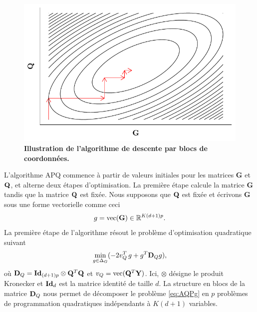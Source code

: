 \documentclass[12pt,a4paper,twoside]{ugathesis}
\begin{document}
\begin{figure}[t]
\centering
\includegraphics{./OUTPUT/Rplots/coordinate_descente.pdf}
\caption{{\bf Illustration de l'algorithme de descente par blocs de
    coordonnées.}}
\label{fig:coordinate_descente}
\end{figure}

L'algorithme APQ commence à partir de valeurs initiales pour les matrices
\(\mathbf{G}\) et \(\mathbf{Q}\), et alterne deux étapes d'optimisation. La première étape
calcule la matrice \(\mathbf{G}\) tandis que la matrice \(\mathbf{Q}\) est fixée. Nous
supposons que \(\mathbf{Q}\) est fixée et écrivons \(\mathbf{G}\) sous une forme vectorielle
comme ceci
\begin{equation*} 
g = {\rm vec}(\mathbf{G}) \in \mathbb{R} ^ {K(d +1)p}.
\end{equation*}
La première étape de l'algorithme résout le problème d'optimisation
quadratique suivant 
\begin{equation}
\begin{aligned}
\underset{g \in \Delta_{G}}{\min}  ( -2  v^T_Q \, g + g^T \mathbf{D}_{Q} g ) ,
\end{aligned}
\label{eq:AQPg}
\end{equation}
où \(\mathbf{D}_{Q} = \mathbf{Id}_{(d + 1) p} \otimes \mathbf{Q}^T \mathbf{Q}\) et \(v_Q = {\rm vec} (\mathbf{Q}^T \mathbf{Y})\).
Ici, \(\otimes\) désigne le produit Kronecker et \(\mathbf{Id}_{d}\) est la matrice identité
de taille \(d\). La structure en blocs de la matrice \(\mathbf{D}_{Q}\) nous permet de
décomposer le problème \eqref{eq:AQPg} en \(p\) problèmes de programmation
quadratiques indépendants à \(K(d + 1)\) variables.
\end{document}
